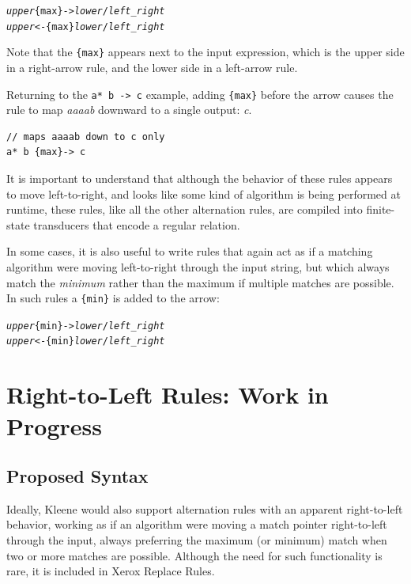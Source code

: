 \begin{alltt}
\emph{upper} \{max\}-> \emph{lower} / \emph{left} _ \emph{right}
\emph{upper} <-\{max\} \emph{lower} / \emph{left} _ \emph{right}
\end{alltt}

\noindent
Note that the \verb!{max}! appears next to the input expression, which is the upper side in a right-arrow rule, and the lower side
in a left-arrow rule.

Returning to the \verb!a* b -> c! example, adding \verb!{max}! before the arrow causes the rule to map
\emph{aaaab} downward to a single output: \emph{c}.

\begin{Verbatim}
// maps aaaab down to c only
a* b {max}-> c
\end{Verbatim}

\noindent
It is important to understand that although the behavior of these rules appears to move
left-to-right, and looks like some kind of algorithm is being performed at runtime, these
rules, like all the other alternation rules, are compiled into finite-state transducers
that encode a regular relation.

In some cases, it is also useful to write rules that again act as if a matching algorithm
were moving left-to-right through the input string, but which always match the
\emph{minimum} rather than the maximum if multiple matches are possible.  In such rules a
\verb!{min}! is added to the arrow:

\begin{alltt}
\emph{upper} \{min\}-> \emph{lower} / \emph{left} _ \emph{right}
\emph{upper} <-\{min\} \emph{lower} / \emph{left} _ \emph{right}
\end{alltt}

\section{Right-to-Left Rules: Work in Progress}

\subsection{Proposed Syntax}

Ideally, Kleene would also support alternation rules with an apparent
right-to-left behavior, working as if an algorithm were moving a match
pointer right-to-left through the input, always preferring the maximum (or
minimum) match when two or more matches are possible.  Although the need
for such functionality is rare, it is included in Xerox \xfst{} Replace
Rules.

